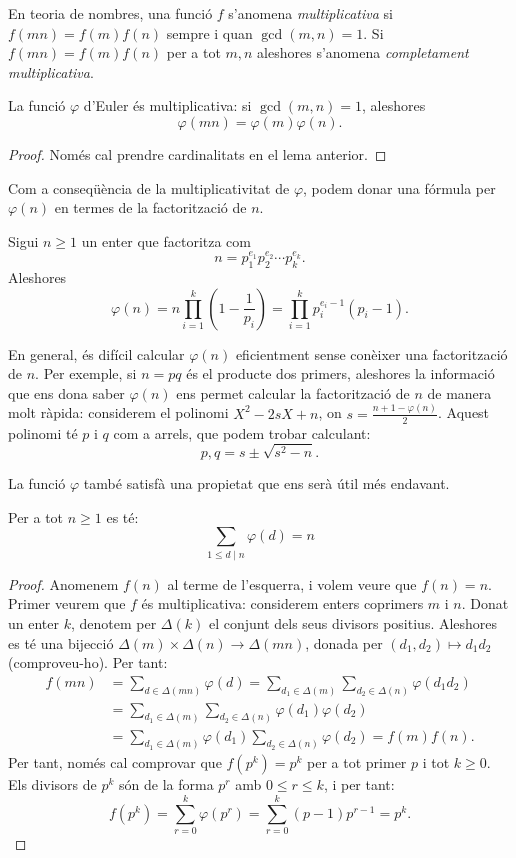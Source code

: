 En teoria de nombres, una funció $f$ s'anomena \emph{multiplicativa} si $f(mn)=f(m)f(n)$ sempre i quan $\gcd(m,n)=1$. Si $f(mn)=f(m)f(n)$ per a tot $m,n$ aleshores s'anomena \emph{completament multiplicativa}.

 \begin{corollary}
 La funció $\varphi$ d'Euler és multiplicativa: si $\gcd(m,n)=1$, aleshores
 \[
 \varphi(mn)=\varphi(m)\varphi(n).
 \]
 \end{corollary}
 \begin{proof}
  Només cal prendre cardinalitats en el lema anterior.
 \end{proof}
Com a conseqüència de la multiplicativitat de $\varphi$, podem donar una fórmula per $\varphi(n)$ en termes de la factorització de $n$.
\begin{proposition}
 Sigui $n\geq 1$ un enter que factoritza com
 \[
 n = p_1^{e_1} p_2^{e_2}\cdots p_k^{e_k}.
 \]
 Aleshores
\[
\varphi(n)= n \prod_{i=1}^k \left(1-\frac{1}{p_i}\right) = \prod_{i=1}^k p_i^{e_i-1}(p_i-1).
\]
\end{proposition}

\begin{remark}
\label{rmk:factoritzar-i-phi}
En general, és difícil calcular $\varphi(n)$ eficientment sense conèixer una factorització de $n$. Per exemple, si $n=pq$ és el producte dos primers, aleshores la informació que ens dona saber $\varphi(n)$ ens permet calcular la factorització de $n$ de manera molt ràpida: considerem el polinomi $X^2-2sX + n$, on $s = \frac{n+1-\varphi(n)}{2}$. Aquest polinomi té $p$ i $q$ com a arrels, que podem trobar calculant:
\[
p,q = s \pm \sqrt{s^2 - n}.
\]
\end{remark}
La funció $\varphi$ també satisfà una propietat que ens serà útil més endavant.

\begin{proposition}
 Per a tot $n\geq 1$ es té:
 \[
 \sum_{1\leq d\mid n}\varphi(d) = n
 \]
\end{proposition}
\begin{proof}
 Anomenem $f(n)$ al terme de l'esquerra, i volem veure que $f(n)=n$. Primer veurem que $f$ és multiplicativa: considerem enters coprimers $m$ i $n$. Donat un enter $k$, denotem per $\Delta(k)$ el conjunt dels seus divisors positius. Aleshores es té una bijecció $\Delta(m)\times\Delta(n)\to \Delta(mn)$, donada per $(d_1,d_2)\mapsto d_1d_2$ (comproveu-ho). Per tant:
 \begin{align*}
 f(mn)&=\sum_{d\in\Delta(mn)}\varphi(d) = \sum_{d_1\in\Delta(m)}\sum_{d_2\in\Delta(n)}\varphi(d_1d_2)\\
 &=\sum_{d_1\in\Delta(m)}\sum_{d_2\in\Delta(n)}\varphi(d_1)\varphi(d_2)\\
 &=\sum_{d_1\in\Delta(m)}\varphi(d_1)\sum_{d_2\in\Delta(n)}\varphi(d_2) = f(m)f(n).
 \end{align*}
 Per tant, només cal comprovar que $f(p^k) = p^k$ per a tot primer $p$ i tot $k\geq 0$. Els divisors de $p^k$ són de la forma $p^r$ amb $0\leq r \leq k$, i per tant:
\[
f(p^k) = \sum_{r=0}^k \varphi(p^r) = \sum_{r=0}^k (p-1)p^{r-1} = p^k.
\]
\end{proof}
